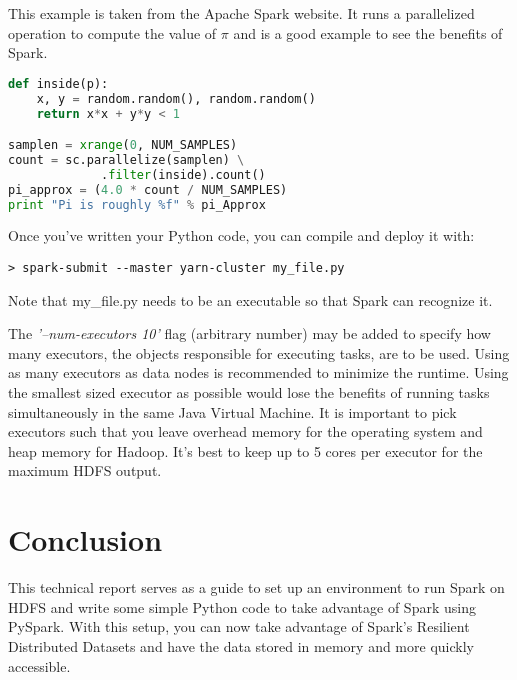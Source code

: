 \documentclass[9pt,twocolumn,twoside]{idsi}
\begin{document}
This example is taken from the Apache Spark website. It runs a parallelized operation to compute the value of $\pi$ and is a good example to see the benefits of Spark.

\begin{lstlisting}[language=Python]
def inside(p):
    x, y = random.random(), random.random()
    return x*x + y*y < 1

samplen = xrange(0, NUM_SAMPLES)
count = sc.parallelize(samplen) \
             .filter(inside).count()
pi_approx = (4.0 * count / NUM_SAMPLES)
print "Pi is roughly %f" % pi_Approx
\end{lstlisting}

Once you've written your Python code, you can compile and deploy it with:
\begin{verbatim}
> spark-submit --master yarn-cluster my_file.py
\end{verbatim}
Note that my\_file.py needs to be an executable so that Spark can recognize it.

\noindent


The \textit{'--num-executors 10'} flag (arbitrary number) may be added to specify how many executors, the objects responsible for executing tasks, are to be used. Using as many executors as data nodes is recommended to minimize the runtime. Using the smallest sized executor as possible would lose the benefits of running tasks simultaneously in the same Java Virtual Machine. It is important to pick executors such that you leave overhead memory for the operating system and heap memory for Hadoop. It's best to keep up to 5 cores per executor for the maximum HDFS output. 

\section{Conclusion}

This technical report serves as a guide to set up an environment to run Spark on HDFS and write some simple Python code to take advantage of Spark using PySpark. With this setup, you can now take advantage of Spark's Resilient Distributed Datasets and have the data stored in memory and more quickly accessible.
\end{document}
